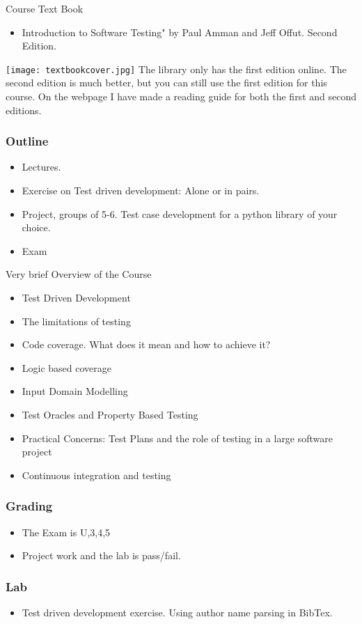 \documentclass{beamer}
\begin{document}
\begin{frame}{Course Text Book}
  \begin{itemize}
  \item Introduction to Software Testing" by Paul Amman and Jeff
    Offut. Second Edition. 
  \end{itemize}
  \texttt{[image: textbookcover.jpg]} The library only has the first
  edition online. The second edition is much better, but you can still
  use the first edition for this course. On the webpage I have made a
  reading guide for both the first and second editions.
\end{frame}
\begin{frame}
  \frametitle{Outline}
  \begin{itemize}
  \item Lectures.
  \item Exercise on Test driven development: Alone or in pairs.
  \item Project, groups of 5-6. Test case development for a python
    library of your choice.
  \item Exam
  \end{itemize}
\end{frame}
\begin{frame}{Very brief Overview of the Course}
  \begin{itemize}
  \item Test Driven Development
  \item The limitations of testing
  \item Code coverage. What does it mean and how to achieve it?
  \item Logic based coverage
  \item Input Domain Modelling
  \item Test Oracles and Property Based Testing
  \item Practical Concerns: Test Plans and the role of testing in a
    large software project
  \item Continuous integration and testing 
  \end{itemize}
\end{frame}
\begin{frame}
  \frametitle{Grading}
  \begin{itemize}
  \item The Exam is U,3,4,5
  \item Project work and the lab is pass/fail.
  \end{itemize}
\end{frame}
\begin{frame}
  \frametitle{Lab}
  \begin{itemize}
  \item Test driven development exercise. Using author name parsing in
    BibTex. 
  \end{itemize}
\end{frame}
\end{document}
